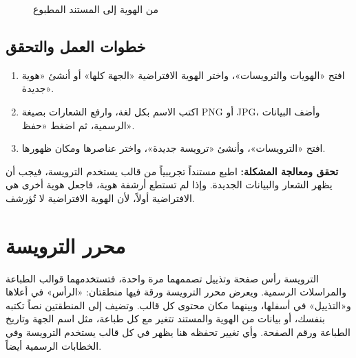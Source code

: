 \begin{figure}[H]
\centering
{}
\rclegend
\caption{من الهوية إلى المستند المطبوع}
\label{fig:builder-identities-model}
\end{figure}

\subsection{خطوات العمل والتحقق}
\begin{enumerate}
\item افتح «الهويات والترويسات»، واختر الهوية الافتراضية «الجهة كلها» أو أنشئ «هوية جديدة».
\item اكتب الاسم بكل لغة، وارفع الشعارات بصيغة PNG أو JPG، وأضف البيانات الرسمية، ثم اضغط «حفظ».
\item افتح «الترويسات»، وأنشئ «ترويسة جديدة»، واختر عناصرها ومكان ظهورها.
\end{enumerate}

\textbf{تحقق ومعالجة المشكلة:} اطبع مستنداً تجريبياً من قالب يستخدم الترويسة، فيجب أن يظهر الشعار والبيانات الجديدة. وإذا لم تستطع أرشفة هوية، فاجعل هوية أخرى هي الافتراضية أولاً، لأن الهوية الافتراضية لا تُؤرشف.

\clearpage
\section{محرر الترويسة}
\label{sec:builder-feature-letterheads}

الترويسة رأس صفحة وتذييل تصممهما مرة واحدة، فتستخدمهما قوالب الطباعة والمراسلات الرسمية. ويعرض محرر الترويسة ورقة فيها منطقتان: «الرأس» في أعلاها و«التذييل» في أسفلها، وبينهما مكان محتوى كل قالب. وتضيف إلى المنطقتين نصاً تكتبه بنفسك، أو بيانات من الهوية والمستند تتغير مع كل طباعة، مثل اسم الجهة وتاريخ الطباعة ورقم الصفحة. وأي تغيير تحفظه هنا يظهر في كل قالب يستخدم الترويسة وفي الخطابات الرسمية أيضاً.

